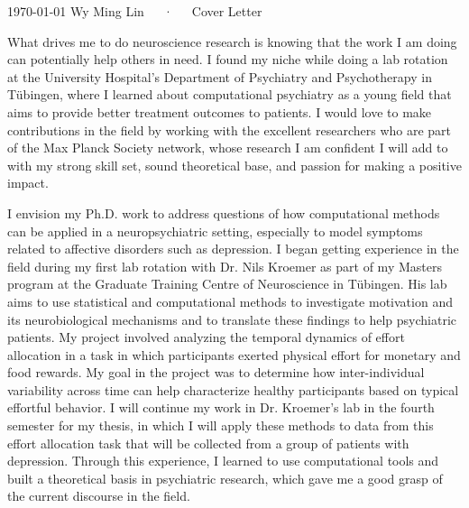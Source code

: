 \documentclass[11pt, a4paper, academicons]{awesome-cv}
\begin{document}
\makecvheader[R]

\makecvfooter
  {\today}
  {Wy Ming Lin~~~·~~~Cover Letter}
  {}

\makelettertitle

\begin{cvletter}
What drives me to do neuroscience research is knowing that the work I am doing can potentially help others in need. I found my niche while doing a lab rotation at the University Hospital’s Department of Psychiatry and Psychotherapy in Tübingen, where I learned about computational psychiatry as a young field that aims to provide better treatment outcomes to patients. I would love to make contributions in the field by working with the excellent researchers who are part of the Max Planck Society network, whose research I am confident I will add to with my strong skill set, sound theoretical base, and passion for making a positive impact.

I envision my Ph.D. work to address questions of how computational methods can be applied in a neuropsychiatric setting, especially to model symptoms related to affective disorders such as depression. I began getting experience in the field during my first lab rotation with Dr. Nils Kroemer as part of my Masters program at the Graduate Training Centre of Neuroscience in Tübingen. His lab aims to use statistical and computational methods to investigate motivation and its neurobiological mechanisms and to translate these findings to help psychiatric patients. My project involved analyzing the temporal dynamics of effort allocation in a task in which participants exerted physical effort for monetary and food rewards. My goal in the project was to determine how inter-individual variability across time can help characterize healthy participants based on typical effortful behavior. I will continue my work in Dr. Kroemer’s lab in the fourth semester for my thesis, in which I will apply these methods to data from this effort allocation task that will be collected from a group of patients with depression. Through this experience, I learned to use computational tools and built a theoretical basis in psychiatric research, which gave me a good grasp of the current discourse in the field.


\end{cvletter}
\end{document}
